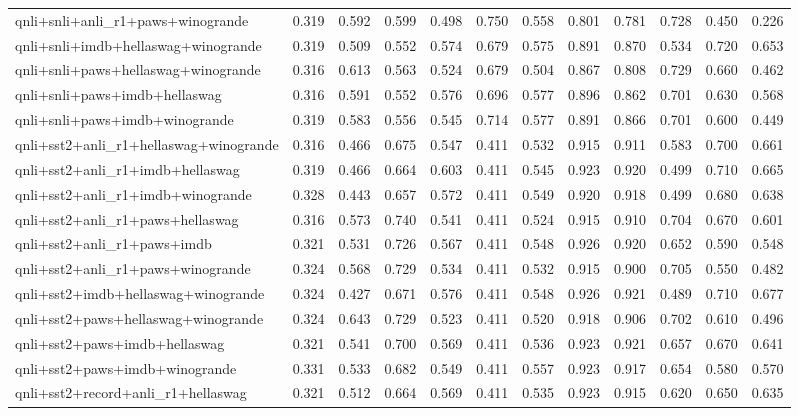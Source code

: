 \begin{table}[t]
\begin{tabular}{lrrrrrrrrrrr}
    qnli+snli+anli\_r1+paws+winogrande & 0.319 & 0.592 & 0.599 & 0.498 & 0.750 & 0.558 & 0.801 & 0.781 & 0.728 & 0.450 & 0.226 \\
    qnli+snli+imdb+hellaswag+winogrande & 0.319 & 0.509 & 0.552 & 0.574 & 0.679 & 0.575 & 0.891 & 0.870 & 0.534 & 0.720 & 0.653 \\
    qnli+snli+paws+hellaswag+winogrande & 0.316 & 0.613 & 0.563 & 0.524 & 0.679 & 0.504 & 0.867 & 0.808 & 0.729 & 0.660 & 0.462 \\
    qnli+snli+paws+imdb+hellaswag & 0.316 & 0.591 & 0.552 & 0.576 & 0.696 & 0.577 & 0.896 & 0.862 & 0.701 & 0.630 & 0.568 \\
    qnli+snli+paws+imdb+winogrande & 0.319 & 0.583 & 0.556 & 0.545 & 0.714 & 0.577 & 0.891 & 0.866 & 0.701 & 0.600 & 0.449 \\
    qnli+sst2+anli\_r1+hellaswag+winogrande & 0.316 & 0.466 & 0.675 & 0.547 & 0.411 & 0.532 & 0.915 & 0.911 & 0.583 & 0.700 & 0.661 \\
    qnli+sst2+anli\_r1+imdb+hellaswag & 0.319 & 0.466 & 0.664 & 0.603 & 0.411 & 0.545 & 0.923 & 0.920 & 0.499 & 0.710 & 0.665 \\
    qnli+sst2+anli\_r1+imdb+winogrande & 0.328 & 0.443 & 0.657 & 0.572 & 0.411 & 0.549 & 0.920 & 0.918 & 0.499 & 0.680 & 0.638 \\
    qnli+sst2+anli\_r1+paws+hellaswag & 0.316 & 0.573 & 0.740 & 0.541 & 0.411 & 0.524 & 0.915 & 0.910 & 0.704 & 0.670 & 0.601 \\
    qnli+sst2+anli\_r1+paws+imdb & 0.321 & 0.531 & 0.726 & 0.567 & 0.411 & 0.548 & 0.926 & 0.920 & 0.652 & 0.590 & 0.548 \\
    qnli+sst2+anli\_r1+paws+winogrande & 0.324 & 0.568 & 0.729 & 0.534 & 0.411 & 0.532 & 0.915 & 0.900 & 0.705 & 0.550 & 0.482 \\
    qnli+sst2+imdb+hellaswag+winogrande & 0.324 & 0.427 & 0.671 & 0.576 & 0.411 & 0.548 & 0.926 & 0.921 & 0.489 & 0.710 & 0.677 \\
    qnli+sst2+paws+hellaswag+winogrande & 0.324 & 0.643 & 0.729 & 0.523 & 0.411 & 0.520 & 0.918 & 0.906 & 0.702 & 0.610 & 0.496 \\
    qnli+sst2+paws+imdb+hellaswag & 0.321 & 0.541 & 0.700 & 0.569 & 0.411 & 0.536 & 0.923 & 0.921 & 0.657 & 0.670 & 0.641 \\
    qnli+sst2+paws+imdb+winogrande & 0.331 & 0.533 & 0.682 & 0.549 & 0.411 & 0.557 & 0.923 & 0.917 & 0.654 & 0.580 & 0.570 \\
    qnli+sst2+record+anli\_r1+hellaswag & 0.321 & 0.512 & 0.664 & 0.569 & 0.411 & 0.535 & 0.923 & 0.915 & 0.620 & 0.650 & 0.635 \\

\end{tabular}
\end{table}
